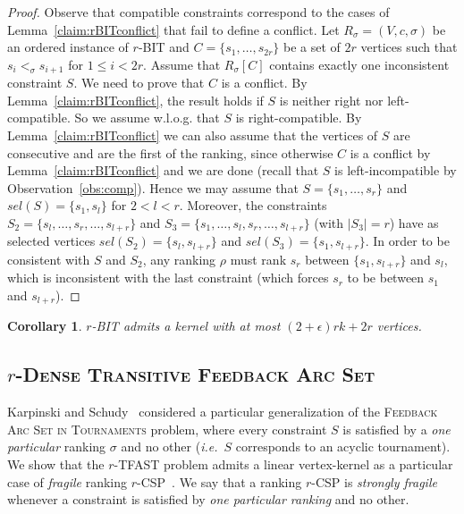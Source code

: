 \documentclass[11pt]{article}
\newtheorem{corollary}[theorem]{Corollary}
\def\ie{{\em i.e.}~}
\newcommand{\FAST}{\textsc{Feedback Arc Set in Tournaments}}
\newcommand{\rFAST}{\textsc{$r$-Dense Transitive Feedback Arc Set}}
\begin{document}
\begin{proof} 	Observe that compatible constraints correspond to the cases of 
Lemma~\ref{claim:rBITconflict} that fail to define a conflict. 
Let $R_\sigma = (V, c, \sigma)$ be an ordered instance of {\sc $r$-BIT} and $C = \{s_1, \ldots, s_{2r}\}$ be a set of $2r$ vertices such that 
	$s_i <_\sigma s_{i+1}$ for $1 \leqslant i < 2r$. Assume that $R_\sigma[C]$ contains exactly 
	one inconsistent constraint $S$. We need to prove that $C$ is a conflict. By Lemma~\ref{claim:rBITconflict}, the result holds if $S$ is neither right nor left-compatible. So we assume w.l.o.g. that $S$ is right-compatible. By Lemma~\ref{claim:rBITconflict} we can also assume that the vertices of $S$ are consecutive and are the first of the ranking, since  otherwise $C$ is a conflict by Lemma~\ref{claim:rBITconflict} and we are done (recall that $S$ is left-incompatible by Observation~\ref{obs:comp}). Hence we may assume that $S = \{s_1, \ldots, s_r\}$ and $sel(S) = \{s_1, s_l\}$ for $2 < l < r$. Moreover, the constraints $S_2 = \{s_l, \ldots, s_r, \ldots, s_{l+r}\}$ and $S_3 = \{s_1, \ldots, s_l, s_r, \ldots, s_{l+r}\}$ (with $|S_3| = r$) have as selected vertices $sel(S_2) = \{s_l, s_{l + r}\}$ and $sel(S_3) = \{s_1, s_{l + r}\}$. 
In order to be consistent with $S$ and $S_2$, any ranking $\rho$ must rank $s_r$ 
between $\{s_1,s_{l+r}\}$ and $s_l$, which is inconsistent with the last constraint (which forces $s_r$ to be between $s_1$ 
and $s_{l+r}$). 
\end{proof}
\vspace{0.2cm}

\begin{corollary}
\label{thm:kernelrBIT}
	$r$-BIT admits a kernel with at most $(2 + \epsilon)rk + 2r$ vertices.
\end{corollary}

\subsection{{\sc \rFAST{}}} 
\label{subsec:rfast}

Karpinski and Schudy~\cite{KS10} considered a particular generalization of the \FAST{} problem, where every constraint $S$ is satisfied by a \emph{one particular} ranking $\sigma$ and no other (\ie $S$ corresponds to an acyclic tournament). 
We show that the {\sc $r$-TFAST}  problem admits a linear vertex-kernel as a particular case of \emph{fragile} ranking $r$-CSP~\cite{KS11}. We say that a ranking 
$r$-CSP is \emph{strongly fragile} whenever a constraint is satisfied by \emph{one particular ranking} and no other. 
\end{document}
